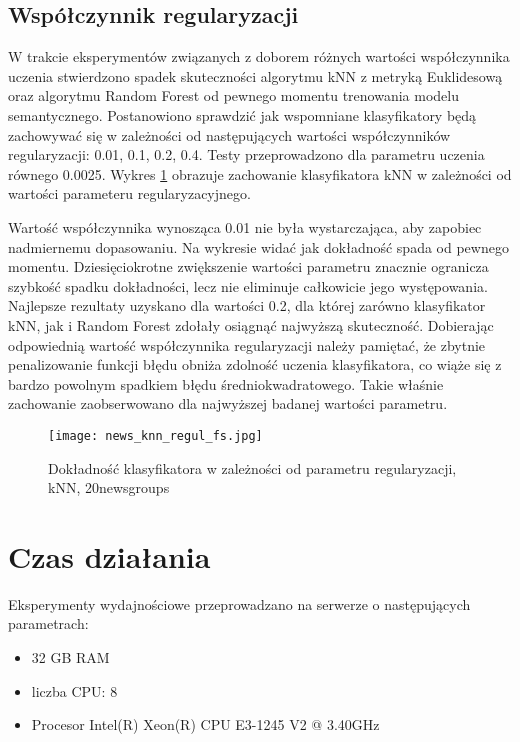 \documentclass{pracamgr}
\begin{document}
\subsection{Współczynnik regularyzacji}

W trakcie eksperymentów związanych z doborem różnych wartości współczynnika uczenia stwierdzono spadek skuteczności algorytmu kNN z metryką Euklidesową oraz algorytmu Random Forest od pewnego momentu trenowania modelu semantycznego. Postanowiono sprawdzić jak wspomniane klasyfikatory będą zachowywać się w zależności od następujących wartości współczynników regularyzacji: 0.01, 0.1, 0.2, 0.4. Testy przeprowadzono dla parametru uczenia równego 0.0025. 
Wykres \ref{fig:news_knn_regul_fs} obrazuje zachowanie klasyfikatora kNN w zależności od wartości parameteru regularyzacyjnego.

Wartość współczynnika wynosząca 0.01 nie była wystarczająca, aby zapobiec nadmiernemu dopasowaniu. Na wykresie widać jak dokładność spada od pewnego momentu. Dziesięciokrotne zwiększenie wartości parametru znacznie ogranicza szybkość spadku dokładności, lecz nie eliminuje całkowicie jego występowania. Najlepsze rezultaty uzyskano dla wartości 0.2, dla której zarówno klasyfikator kNN, jak i Random Forest zdołały osiągnąć najwyższą skuteczność. Dobierając odpowiednią wartość współczynnika regularyzacji należy pamiętać, że zbytnie penalizowanie funkcji błędu obniża zdolność uczenia klasyfikatora, co wiąże się z bardzo powolnym spadkiem błędu średniokwadratowego. Takie właśnie zachowanie zaobserwowano dla najwyższej badanej wartości parametru.

\begin{figure}[]
\centering
  \texttt{[image: news\_knn\_regul\_fs.jpg]}
  \caption{Dokładność klasyfikatora w zależności od parametru regularyzacji, kNN, 20newsgroups}\label{fig:news_knn_regul_fs}
\end{figure}

\section{Czas działania}
Eksperymenty wydajnościowe przeprowadzano na serwerze o następujących parametrach: 
\begin{itemize}
\item 32 GB RAM
\item liczba CPU: 8
\item Procesor Intel(R) Xeon(R) CPU E3-1245 V2 @ 3.40GHz
    
\end{itemize}
\end{document}
